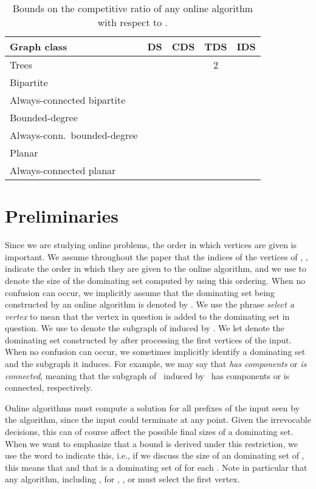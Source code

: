 \begin{table}
\begin{tabular}{|l||c|c|c|c|}
\hline
Graph class & DS & CDS & TDS & IDS \\ 
\hline\hline
Trees &  &  & 2 & \multirow{3}{*}{}\\ 
\hhline{|----|~|}
Bipartite & \multicolumn{2}{c|}{} & \multirow{2}{*}{} & \\
\hhline{|---~|~|}
Always-connected bipartite &    \multicolumn{2}{c|}{} & &  \\
\hline
Bounded-degree &  &  & \multirow{2}{*}{}  & \\
\hhline{|---|~|-|}
Always-conn.\ bounded-degree & &  &  & \\
\hline
Planar & \multicolumn{2}{c|}{\multirow{2}{*}{}} &\multirow{2}{*}{} & \multirow{2}{*}{}\\
\hhline{|-|~~|~|~|}
Always-connected planar & \multicolumn{2}{c|}{}  & & \\
\hline
\end{tabular}
\caption{Bounds on the competitive ratio of  any online algorithm  with respect to \offopt.\label{table:any-offopt}}
\end{table}



\section{Preliminaries}
Since we are studying online problems, the order in which vertices
are given is important. We assume throughout the paper that
the indices of the vertices of , ,
indicate the order in which they are given to the online algorithm,
and we use  to denote the size of the dominating set
computed by \ALG using this ordering.
When no confusion can occur, we implicitly assume that the dominating
set being constructed by an online algorithm  is denoted by . 
We use the phrase \emph{select a vertex} to mean that the vertex
in question is added to the dominating set in question.
We use  to denote the subgraph of  induced by .
We let  denote
the dominating set constructed by  after processing the first
 vertices of the input.
When no confusion can occur, we 
sometimes implicitly 
identify a dominating set  and the subgraph it induces. 
For example, we may say that
\emph{ has  components} or \emph{is connected},
meaning that the subgraph of~
induced by~ has  components or is connected, respectively.

Online algorithms must compute a solution for all prefixes of
the input seen by the algorithm, since the input could terminate at
any point. Given the irrevocable decisions,
this can of course affect the possible final sizes of a dominating
set. When we want to emphasize that a bound is derived under this
restriction, we use the word \emph{\incr} to indicate this,
i.e., if we discuss the size of an \incr dominating set  of ,
this means that 
 and that 
 is a dominating set of  for each .
Note in particular that any \incr algorithm, including \onopt, for
\ds, \cds, or \ids must select the first vertex.

